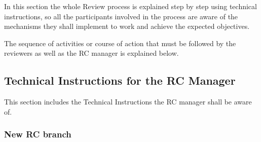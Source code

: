 \documentclass{template/openetcs_article}
\begin{document}
In this section the whole Review process is explained step by step using technical instructions, so all the participants involved in the process are aware of the mechanisms they shall implement to work and achieve the expected objectives. 

The sequence of activities or course of action that must be followed by the reviewers as well as the RC manager is explained below. 


\subsection{Technical Instructions for the RC Manager}

This section includes the Technical Instructions the RC manager shall be aware of.

\subsubsection{New RC branch}
\end{document}
